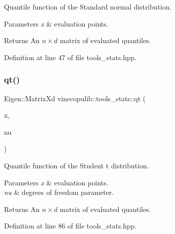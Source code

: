 Quantile function of the Standard normal distribution. 


\begin{DoxyParams}{Parameters}
{\em x} & evaluation points.\\
\hline
\end{DoxyParams}
\begin{DoxyReturn}{Returns}
An $ n \times d $ matrix of evaluated quantiles. 
\end{DoxyReturn}


Definition at line 47 of file tools\+\_\+stats.\+hpp.

\mbox{\label{namespacevinecopulib_1_1tools__stats_a17eb427c3a562c72d2e87438da1cd279}} 
\subsubsection{\texorpdfstring{qt()}{qt()}}
{\footnotesize\ttfamily Eigen\+::\+Matrix\+Xd vinecopulib\+::tools\+\_\+stats\+::qt (\begin{DoxyParamCaption}\item[{const Eigen\+::\+Matrix\+Xd \&}]{x,  }\item[{double}]{nu }\end{DoxyParamCaption})\hspace{0.3cm}{\ttfamily [inline]}}



Quantile function of the Student t distribution. 


\begin{DoxyParams}{Parameters}
{\em x} & evaluation points. \\
\hline
{\em nu} & degrees of freedom parameter.\\
\hline
\end{DoxyParams}
\begin{DoxyReturn}{Returns}
An $ n \times d $ matrix of evaluated quantiles. 
\end{DoxyReturn}


Definition at line 86 of file tools\+\_\+stats.\+hpp.

\mbox{\label{namespacevinecopulib_1_1tools__stats_a4f9a1f8fdbe23db916b013f7f6e500ca}} 
